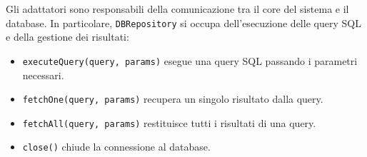Gli adattatori sono responsabili della comunicazione tra il core del sistema e il database. In particolare, \texttt{DBRepository} si occupa dell'esecuzione delle query SQL e della gestione dei risultati:
\begin{itemize}
    \item \texttt{executeQuery(query, params)} esegue una query SQL passando i parametri necessari.
    \item \texttt{fetchOne(query, params)} recupera un singolo risultato dalla query.
    \item \texttt{fetchAll(query, params)} restituisce tutti i risultati di una query.
    \item \texttt{close()} chiude la connessione al database.
\end{itemize}



